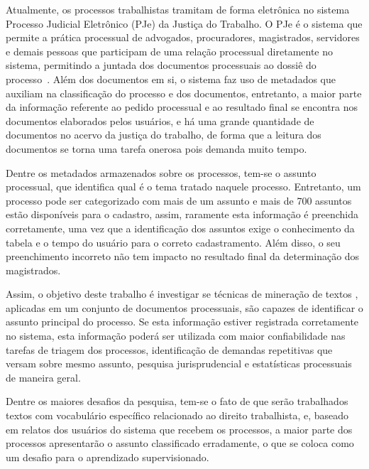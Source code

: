 Atualmente, os processos trabalhistas tramitam de forma eletrônica no sistema Processo Judicial Eletrônico  (PJe) da Justiça do Trabalho. O PJe é o sistema que permite a prática processual de advogados, procuradores,  magistrados, servidores e demais pessoas que participam de uma relação processual diretamente no sistema, permitindo a juntada dos documentos processuais ao dossiê do processo~\cite{pje}. Além dos documentos em si, o sistema faz uso de metadados que auxiliam na classificação do processo e dos documentos, entretanto, a maior parte da informação referente ao pedido processual e ao resultado final se encontra nos documentos elaborados pelos usuários, e há uma grande quantidade de documentos no acervo da justiça do trabalho, de forma que a leitura dos documentos se torna uma tarefa onerosa pois demanda muito tempo. 

Dentre os metadados armazenados sobre os processos, tem-se o assunto processual, que identifica qual é o tema tratado naquele processo. Entretanto, um processo pode ser categorizado com mais de um assunto e mais de 700 assuntos estão disponíveis para o cadastro, assim, raramente esta informação é preenchida corretamente, uma vez que a identificação dos assuntos exige o conhecimento da tabela e o tempo do usuário para o correto cadastramento. Além disso, o seu preenchimento incorreto não tem impacto no resultado final da determinação dos magistrados. 



Assim, o objetivo deste trabalho é investigar se técnicas de mineração de textos , aplicadas em um conjunto de documentos processuais, são capazes de identificar o assunto principal do processo. Se esta informação estiver registrada corretamente no sistema, esta informação poderá ser utilizada com maior confiabilidade nas tarefas de triagem dos processos, identificação de demandas repetitivas que versam sobre mesmo assunto, pesquisa jurisprudencial e estatísticas processuais de maneira geral. 

Dentre os maiores desafios da pesquisa, tem-se o fato de que serão trabalhados textos com vocabulário específico relacionado ao direito trabalhista, e, baseado em relatos dos usuários do sistema que recebem os processos, a maior parte dos processos apresentarão o assunto classificado erradamente, o que se coloca como um desafio para o aprendizado supervisionado. 

